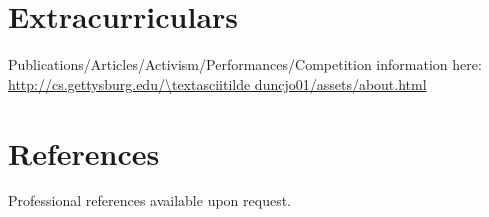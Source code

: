 \documentclass[11pt]{article}
\begin{document}
\section*{Extracurriculars}
Publications/Articles/Activism/Performances/Competition information here:\\\url{http://cs.gettysburg.edu/\textasciitilde duncjo01/assets/about.html}

\section*{References}
Professional references available upon request. 

\end{document}
